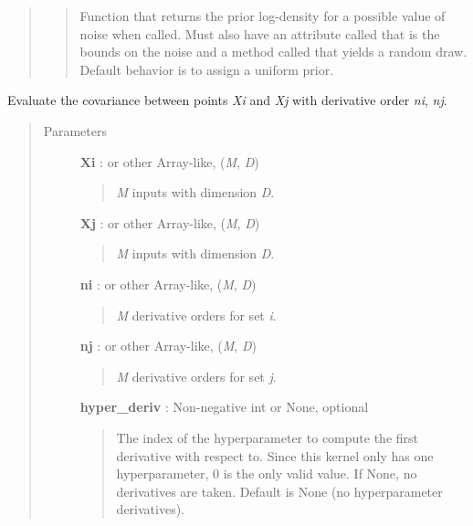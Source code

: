 \documentclass[letterpaper,10pt,english]{sphinxmanual}
\begin{document}
\begin{fulllineitems}
\begin{quote}
\begin{description}
\begin{quote}
Function that returns the prior log-density for a possible value of
noise when called. Must also have an attribute called 
that is the bounds on the noise and a method called
 that yields a random draw. Default behavior is
to assign a uniform prior.
\end{quote}

\end{description}\end{quote}

\begin{fulllineitems}
\label{gptools.kernel:gptools.kernel.noise.DiagonalNoiseKernel.__call__}
Evaluate the covariance between points \emph{Xi} and \emph{Xj} with derivative order \emph{ni}, \emph{nj}.
\begin{quote}\begin{description}
\item[{Parameters}] \leavevmode
\textbf{Xi} :  or other Array-like, (\emph{M}, \emph{D})
\begin{quote}

\emph{M} inputs with dimension \emph{D}.
\end{quote}

\textbf{Xj} :  or other Array-like, (\emph{M}, \emph{D})
\begin{quote}

\emph{M} inputs with dimension \emph{D}.
\end{quote}

\textbf{ni} :  or other Array-like, (\emph{M}, \emph{D})
\begin{quote}

\emph{M} derivative orders for set \emph{i}.
\end{quote}

\textbf{nj} :  or other Array-like, (\emph{M}, \emph{D})
\begin{quote}

\emph{M} derivative orders for set \emph{j}.
\end{quote}

\textbf{hyper\_deriv} : Non-negative int or None, optional
\begin{quote}

The index of the hyperparameter to compute the first derivative
with respect to. Since this kernel only has one hyperparameter, 0
is the only valid value. If None, no derivatives are taken. Default
is None (no hyperparameter derivatives).
\end{quote}


\end{description}
\end{quote}
\end{fulllineitems}
\end{fulllineitems}
\end{document}

